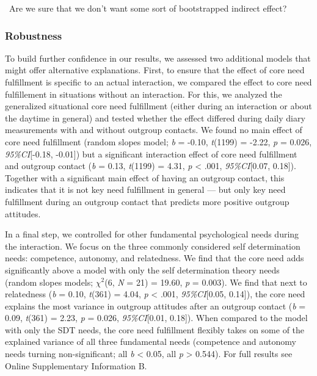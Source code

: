 \faQuestionCircle~Are we sure that we don't want some sort of
bootstrapped indirect effect?

\subsubsection{Robustness}

To build further confidence in our results, we assessed two additional
models that might offer alternative explanations. First, to ensure that
the effect of core need fulfillment is specific to an actual
interaction, we compared the effect to core need fulfillement in
situations without an interaction. For this, we analyzed the generalized
situational core need fulfillment (either during an interaction or about
the daytime in general) and tested whether the effect differed during
daily diary measurements with and without outgroup contacts. We found no
main effect of core need fulfillment (random slopes model; \textit{b} =
-0.10, \textit{t}(1199) = -2.22, \textit{p} = 0.026,
\textit{95\%CI}{[}-0.18, -0.01{]}) but a significant interaction effect
of core need fulfillment and outgroup contact (\textit{b} = 0.13,
\textit{t}(1199) = 4.31, \textit{p} \textless{} .001,
\textit{95\%CI}{[}0.07, 0.18{]}). Together with a significant main
effect of having an outgroup contact, this indicates that it is not key
need fulfillment in general --- but only key need fulfillment during an
outgroup contact that predicts more positive outgroup attitudes.

In a final step, we controlled for other fundamental psychological needs
during the interaction. We focus on the three commonly considered self
determination needs: competence, autonomy, and relatedness. We find that
the core need adds significantly above a model with only the self
determination theory needs (random slopes models; \(\chi^2\)(6,
\textit{N} = 21) = 19.60, \textit{p} = 0.003). We find that next to
relatedness (\textit{b} = 0.10, \textit{t}(361) = 4.04, \textit{p}
\textless{} .001, \textit{95\%CI}{[}0.05, 0.14{]}), the core need
explains the most variance in outgroup attitudes after an outgroup
contact (\textit{b} = 0.09, \textit{t}(361) = 2.23, \textit{p} = 0.026,
\textit{95\%CI}{[}0.01, 0.18{]}). When compared to the model with only
the SDT needs, the core need fulfillment flexibly takes on some of the
explained variance of all three fundamental needs (competence and
autonomy needs turning non-significant; all \textit{b} \textless{} 0.05,
all \textit{p} \textgreater{} 0.544). For full results see Online
Supplementary Information B.

